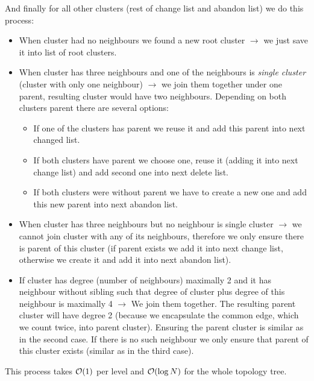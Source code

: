 And finally for all other clusters (rest of change list and abandon list) we do
this process:
\begin{itemize}

\item {\I When cluster had no neighbours we found a new root cluster}
$\rightarrow$ we just save it into list of root clusters.

\item {\I When cluster has three neighbours and one of the neighbours is {\sl single
cluster} (cluster with only one neighbour)} $\rightarrow$ we join them together
under one parent, resulting cluster would have two neighbours. Depending on both
clusters parent there are several options:
	\begin{itemize}
	\item If one of the clusters has parent we reuse it and add this parent
	into next changed list.
	\item If both clusters have parent we choose one, reuse it (adding it
	into next change list) and add second one into next delete list.
	\item If both clusters were without parent we have to create a new one
	and add this new parent into next abandon list.
	\end{itemize}

\item {\I When cluster has three neighbours but no neighbour is single cluster}
$\rightarrow$ we cannot join cluster with any of its neighbours, therefore we
only ensure there is parent of this cluster (if parent exists we add it into
next change list, otherwise we create it and add it into next abandon list).

\item {\I If cluster has degree (number of neighbours) maximally 2 and it has
neighbour without sibling such that degree of cluster plus degree of this
neighbour is maximally 4} $\rightarrow$ We join them together. The resulting parent cluster
will have degree 2 (because we encapsulate the common edge, which we count
twice, into parent cluster). Ensuring the parent cluster is similar as in the
second case. If there is no such neighbour we only ensure that parent of this cluster exists
(similar as in the third case).

\end{itemize}

This process takes ${\cal O}(1)$ per level and ${\cal O}(\log N)$ for the whole topology tree.


